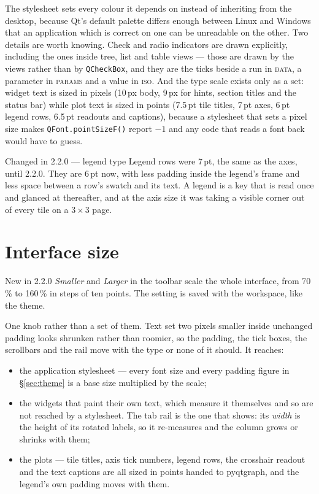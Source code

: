 \documentclass[11pt,a4paper,oneside]{report}
\newcommand{\appver}{2.2.0}
\newcommand{\code}[1]{\texttt{#1}}
\newcommand{\tab}[1]{\textsc{#1}}
\begin{document}
The stylesheet sets every colour it depends on instead of inheriting from the
desktop, because Qt's default palette differs enough between Linux and Windows
that an application which is correct on one can be unreadable on the other. Two
details are worth knowing. Check and radio indicators are drawn explicitly,
including the ones inside tree, list and table views --- those are drawn by the
views rather than by \code{QCheckBox}, and they are the ticks beside a run in
\tab{data}, a parameter in \tab{params} and a value in \tab{iso}. And the type
scale exists only as a set: widget text is sized in pixels (10\,px body, 9\,px
for hints, section titles and the status bar) while plot text is sized in points
(7.5\,pt tile titles, 7\,pt axes, 6\,pt legend rows, 6.5\,pt readouts and
captions), because a stylesheet that sets a pixel size makes
\code{QFont.pointSizeF()} report $-1$ and any code that reads a font back would
have to guess.

\begin{aoenew}{Changed in \appver{} --- legend type}
Legend rows were 7\,pt, the same as the axes, until \appver. They are 6\,pt now,
with less padding inside the legend's frame and less space between a row's
swatch and its text. A legend is a key that is read once and glanced at
thereafter, and at the axis size it was taking a visible corner out of every
tile on a $3 \times 3$ page.
\end{aoenew}

\section{Interface size}
\label{sec:uiscale}

\begin{aoenew}{New in \appver}
\emph{Smaller} and \emph{Larger} in the toolbar scale the whole interface,
from 70\,\% to 160\,\% in steps of ten points. The setting is saved with the
workspace, like the theme.
\end{aoenew}

One knob rather than a set of them. Text set two pixels smaller inside
unchanged padding looks shrunken rather than roomier, so the padding, the tick
boxes, the scrollbars and the rail move with the type or none of it should. It
reaches:

\begin{itemize}
\item the application stylesheet --- every font size and every padding figure
  in \S\ref{sec:theme} is a base size multiplied by the scale;
\item the widgets that paint their own text, which measure it themselves and
  so are not reached by a stylesheet. The tab rail is the one that shows: its
  \emph{width} is the height of its rotated labels, so it re-measures and the
  column grows or shrinks with them;
\item the plots --- tile titles, axis tick numbers, legend rows, the crosshair
  readout and the text captions are all sized in points handed to pyqtgraph,
  and the legend's own padding moves with them.
\end{itemize}
\end{document}
